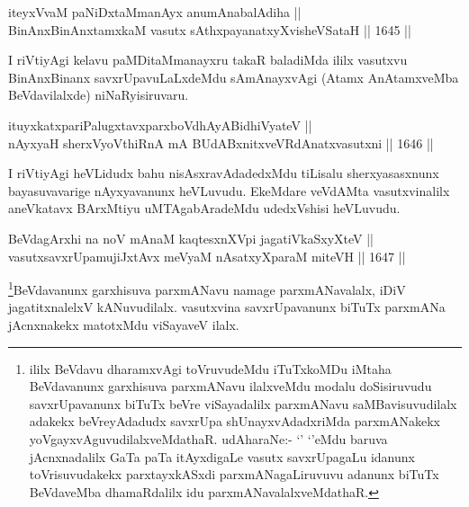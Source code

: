 
\begin{shl}
iteyxVvaM paNiDxtaMmanAyx anumAnabalAdiha  || \\
BinAnxBinAnxtamxkaM vasutx sAthxpayanatxyXvisheVSataH \hfill || 1645 ||  
\end{shl}

\begin{artha}
I riVtiyAgi kelavu paMDitaMmanayxru takaR baladiMda ililx vasutxvu BinAnxBinanx savxrUpavuLaLxdeMdu sAmAnayxvAgi (Atamx AnAtamxveMba BeVdavilalxde) niNaRyisiruvaru.
\end{artha}


\begin{shl}
ituyxkatxpariPalugxtavxparxboVdhAyABidhiVyateV || \\
nAyxyaH sherxVyoVthiRnA mA BUdABxnitxveVRdAnatxvasutxni \hfill || 1646 ||  
\end{shl}

\begin{artha}
I riVtiyAgi heVLidudx bahu nisAsxravAdadedxMdu tiLisalu sherxyasasxnunx bayasuvavarige nAyxyavanunx heVLuvudu. EkeMdare veVdAMta vasutxvinalilx aneVkatavx BArxMtiyu uMTAgabAradeMdu udedxVshisi heVLuvudu.
\end{artha}

\begin{shl}
BeVdagArxhi na noV mAnaM kaqtesxnXV\s pi jagatiVkaSxyXteV ||  \\
vasutxsavxrUpamujiJxtAvx meVyaM nAsatxyXparaM miteVH \hfill || 1647 ||  
\end{shl}

\begin{artha}
\footnote{ililx BeVdavu dharamxvAgi toVruvudeMdu iTuTxkoMDu iMtaha BeVdavanunx garxhisuva parxmANavu ilalxveMdu modalu doSisiruvudu savxrUpavanunx biTuTx beVre viSayadalilx parxmANavu saMBavisuvudilalx adakekx beVreyAdadudx savxrUpa shUnayxvAdadxriMda parxmANakekx yoVgayxvAguvudilalxveMdathaR. udAharaNe:- `\stext' `\stext'eMdu baruva jAcnxnadalilx GaTa paTa itAyxdigaLe vasutx savxrUpagaLu idanunx toVrisuvudakekx parxtayxkASxdi parxmANagaLiruvuvu adanunx biTuTx BeVdaveMba dhamaRdalilx idu parxmANavalalxveMdathaR.}BeVdavanunx garxhisuva parxmANavu namage parxmANavalalx, iDiV jagatitxnalelxV kANuvudilalx. vasutxvina savxrUpavanunx biTuTx parxmANa jAcnxnakekx matotxMdu viSayaveV ilalx.
\end{artha}


